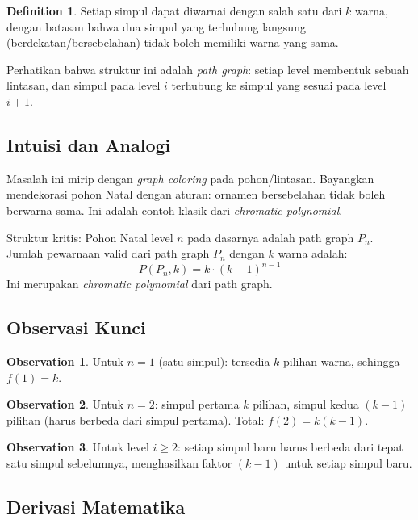 \documentclass[12pt,a4paper]{article}
\theoremstyle{definition}
\newtheorem{definition}{Definition}[section]
\newtheorem{observation}{Observation}[section]
\begin{document}
\begin{definition}
  Setiap simpul dapat diwarnai dengan salah satu dari $k$ warna, dengan batasan
  bahwa dua simpul yang terhubung langsung (berdekatan/bersebelahan) tidak boleh
  memiliki warna yang sama.
\end{definition}

Perhatikan bahwa struktur ini adalah \emph{path graph}: setiap level membentuk
sebuah lintasan, dan simpul pada level $i$ terhubung ke simpul yang sesuai pada
level $i+1$.

\subsection{Intuisi dan Analogi}

Masalah ini mirip dengan \emph{graph coloring} pada pohon/lintasan. Bayangkan
mendekorasi pohon Natal dengan aturan: ornamen bersebelahan tidak boleh berwarna
sama. Ini adalah contoh klasik dari \emph{chromatic polynomial}.

\begin{keyinsight}
  Struktur kritis: Pohon Natal level $n$ pada dasarnya adalah path graph $P_n$.
  Jumlah pewarnaan valid dari path graph $P_n$ dengan $k$ warna adalah:
  \[
    P(P_n,k) = k\cdot(k-1)^{n-1}
  \]
  Ini merupakan \emph{chromatic polynomial} dari path graph.
\end{keyinsight}

\subsection{Observasi Kunci}

\begin{observation}
  Untuk $n=1$ (satu simpul): tersedia $k$ pilihan warna, sehingga $f(1)=k$.
\end{observation}

\begin{observation}
  Untuk $n=2$: simpul pertama $k$ pilihan, simpul kedua $(k-1)$ pilihan (harus
  berbeda dari simpul pertama). Total: $f(2)=k(k-1)$.
\end{observation}

\begin{observation}
  Untuk level $i\geq 2$: setiap simpul baru harus berbeda dari tepat satu simpul
  sebelumnya, menghasilkan faktor $(k-1)$ untuk setiap simpul baru.
\end{observation}

\subsection{Derivasi Matematika}
\end{document}
